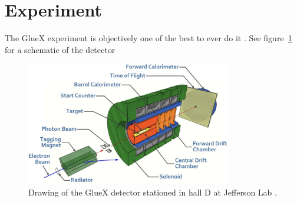 
\section{Experiment}
The GlueX experiment is objectively one of the best to ever do it 
\cite{ADHIKARI2021164807}. See figure~\ref{fig:schematic} for a schematic of the detector

\begin{figure}[h!]
    \centering
    \includegraphics[width=0.8\textwidth]{sections/experiment/images/schematic.png}
    \caption{
        Drawing of the GlueX detector stationed in hall D at Jefferson Lab
        \cite{ADHIKARI2021164807}.
    }
    \label{fig:schematic} 
\end{figure}
